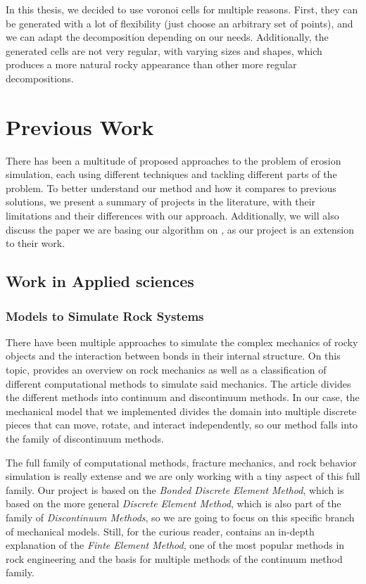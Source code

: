 In this thesis, we decided to use voronoi cells for multiple reasons. First,
they can be generated with a lot of flexibility (just choose an arbitrary set 
of points), and we can adapt the decomposition depending on our needs. 
Additionally, the generated cells are not very regular, with varying 
sizes and shapes, which produces a more natural rocky appearance than
other more regular decompositions.



\chapter{Previous Work} \label{previousWork}

There has been a multitude of proposed approaches to the problem of erosion 
simulation, each using different techniques and tackling different parts 
of the problem. To better understand our method and how it compares to 
previous solutions, we present a summary of projects in the literature, 
with their limitations and their differences with our approach. Additionally,
we will also discuss the paper we are basing our algorithm on 
\cite{10.2312:ceig.20241139}, as our project is an extension to 
their work.

\section{Work in Applied sciences}
\subsection{Models to Simulate Rock Systems}
There have been multiple approaches to simulate the complex mechanics of 
rocky objects and the interaction between bonds in their internal 
structure. On this topic, \cite{mohammadnejad2021overview} provides an 
overview on rock mechanics as well as a classification of different 
computational methods to simulate said mechanics. The article divides 
the different methods into continuum and discontinuum methods. In our 
case, the mechanical model that we implemented divides the domain into 
multiple discrete pieces that can move, rotate, and interact independently, 
so our method falls into the family of discontinuum methods.

\vspace{10pt}

The full family of computational methods, fracture mechanics, 
and rock behavior simulation is really extense and we are only working with a tiny aspect 
of this full family. Our project is based on 
the \textit{Bonded Discrete Element Method}, which is based on the more general 
\textit{Discrete Element Method}, which is also part of the family of \textit{Discontinuum 
Methods}, so we are going to focus on this specific branch of mechanical models.
Still, for the curious reader, \cite{book} contains an in-depth explanation 
of the \textit{Finte Element Method}, one of the most popular methods 
in rock engineering and the basis for multiple methods of the continuum
method family.

